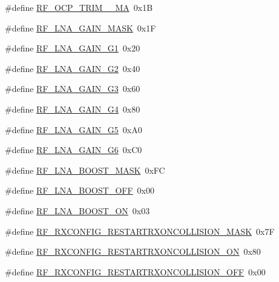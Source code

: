 \begin{DoxyCompactItemize}
\item 
\#define \mbox{\hyperlink{sx1276_regs-_fsk_8h_a26aa5a089e0f570046a41643fa416dce}{R\+F\+\_\+\+O\+C\+P\+\_\+\+T\+R\+I\+M\+\_\+\_\+\+MA}}~0x1B
\item 
\#define \mbox{\hyperlink{sx1276_regs-_fsk_8h_aecfcf32d325020275e659f18f096593a}{R\+F\+\_\+\+L\+N\+A\+\_\+\+G\+A\+I\+N\+\_\+\+M\+A\+SK}}~0x1F
\item 
\#define \mbox{\hyperlink{sx1276_regs-_fsk_8h_a64189fbd3e263a0cd23c565f1cda656e}{R\+F\+\_\+\+L\+N\+A\+\_\+\+G\+A\+I\+N\+\_\+\+G1}}~0x20
\item 
\#define \mbox{\hyperlink{sx1276_regs-_fsk_8h_a5db88ff1f5dcbf3e2e73aa95b7b9e395}{R\+F\+\_\+\+L\+N\+A\+\_\+\+G\+A\+I\+N\+\_\+\+G2}}~0x40
\item 
\#define \mbox{\hyperlink{sx1276_regs-_fsk_8h_a27cb701834892c250a7859261e26d7da}{R\+F\+\_\+\+L\+N\+A\+\_\+\+G\+A\+I\+N\+\_\+\+G3}}~0x60
\item 
\#define \mbox{\hyperlink{sx1276_regs-_fsk_8h_a313f47fe3c3dc5879cfdfa74ecebd9db}{R\+F\+\_\+\+L\+N\+A\+\_\+\+G\+A\+I\+N\+\_\+\+G4}}~0x80
\item 
\#define \mbox{\hyperlink{sx1276_regs-_fsk_8h_ab2fcc04cefd1433048655c2b49e95204}{R\+F\+\_\+\+L\+N\+A\+\_\+\+G\+A\+I\+N\+\_\+\+G5}}~0x\+A0
\item 
\#define \mbox{\hyperlink{sx1276_regs-_fsk_8h_a33e9322adb51544aa391dc909ab83516}{R\+F\+\_\+\+L\+N\+A\+\_\+\+G\+A\+I\+N\+\_\+\+G6}}~0x\+C0
\item 
\#define \mbox{\hyperlink{sx1276_regs-_fsk_8h_a00faa959b2d9cdedea58962da0579c96}{R\+F\+\_\+\+L\+N\+A\+\_\+\+B\+O\+O\+S\+T\+\_\+\+M\+A\+SK}}~0x\+FC
\item 
\#define \mbox{\hyperlink{sx1276_regs-_fsk_8h_a83f435e55a947239e4b0a971e57384fb}{R\+F\+\_\+\+L\+N\+A\+\_\+\+B\+O\+O\+S\+T\+\_\+\+O\+FF}}~0x00
\item 
\#define \mbox{\hyperlink{sx1276_regs-_fsk_8h_ae729805f23edcd913b0442e569f6b151}{R\+F\+\_\+\+L\+N\+A\+\_\+\+B\+O\+O\+S\+T\+\_\+\+ON}}~0x03
\item 
\#define \mbox{\hyperlink{sx1276_regs-_fsk_8h_a5100d76c88dbc8760a74597f945b585c}{R\+F\+\_\+\+R\+X\+C\+O\+N\+F\+I\+G\+\_\+\+R\+E\+S\+T\+A\+R\+T\+R\+X\+O\+N\+C\+O\+L\+L\+I\+S\+I\+O\+N\+\_\+\+M\+A\+SK}}~0x7F
\item 
\#define \mbox{\hyperlink{sx1276_regs-_fsk_8h_ab12ed62cd3ca3d4a4d04717f4e4e1c6e}{R\+F\+\_\+\+R\+X\+C\+O\+N\+F\+I\+G\+\_\+\+R\+E\+S\+T\+A\+R\+T\+R\+X\+O\+N\+C\+O\+L\+L\+I\+S\+I\+O\+N\+\_\+\+ON}}~0x80
\item 
\#define \mbox{\hyperlink{sx1276_regs-_fsk_8h_adcb2e2a2c6ddefb70fa9d95b4091dfbc}{R\+F\+\_\+\+R\+X\+C\+O\+N\+F\+I\+G\+\_\+\+R\+E\+S\+T\+A\+R\+T\+R\+X\+O\+N\+C\+O\+L\+L\+I\+S\+I\+O\+N\+\_\+\+O\+FF}}~0x00

\end{DoxyCompactItemize}
